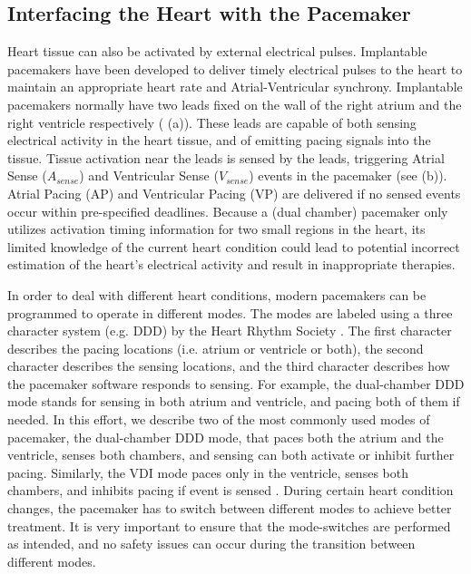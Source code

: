 \subsection{Interfacing the Heart with the Pacemaker}
\label{interfacingHeartPM}
Heart tissue can also be activated by external electrical pulses. 
\textsf{Implantable pacemakers} have been developed to deliver timely electrical pulses to the heart to maintain an appropriate heart rate and Atrial-Ventricular synchrony. 
Implantable pacemakers normally have two leads fixed on the wall of the right atrium and the right ventricle respectively ( (a)). 
These leads are capable of both sensing electrical activity in the heart tissue, and of emitting pacing signals into the tissue. 
Tissue activation near the leads is sensed by the leads, triggering Atrial Sense ($A_{sense}$) and Ventricular Sense ($V_{sense}$) events in the pacemaker (see  (b)). 
Atrial Pacing (AP) and Ventricular Pacing (VP) are delivered if no sensed events occur within pre-specified deadlines. Because a (dual chamber) pacemaker only utilizes activation timing information for two small regions in the heart, its limited knowledge of the current heart condition could lead to potential incorrect estimation of the heart's electrical activity and result in inappropriate therapies.

In order to deal with different heart conditions, modern pacemakers can be programmed to operate in different modes. The modes are labeled using a three character system (e.g. DDD) by the Heart Rhythm Society \cite{fogoros}. The first character describes the pacing locations (i.e. atrium or ventricle or both), the second character describes the sensing locations, and the third character describes how the pacemaker software responds to sensing. For example, the dual-chamber DDD mode stands for sensing in both atrium and ventricle, and pacing both of them if needed. In this effort, we describe two of the most commonly used modes of pacemaker, the dual-chamber DDD mode, that paces both the atrium and the ventricle, senses both chambers, and sensing can both activate or inhibit further pacing. Similarly, the VDI mode paces only in the ventricle, senses both chambers, and inhibits pacing if event is sensed \cite{pacemaker}. During certain heart condition changes, the pacemaker has to switch between different modes to achieve better treatment. It is very important to ensure that the mode-switches are performed as intended, and no safety issues can occur during the transition between different modes.

